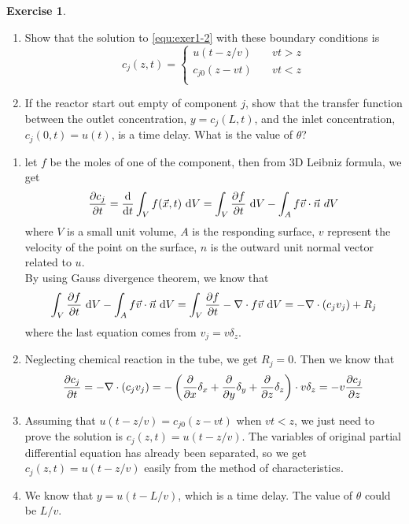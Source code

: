 \documentclass[11pt,a4paper]{report}
\theoremstyle{definition}\newtheorem{exercise}{Exercise}[chapter]
\begin{document}
\begin{exercise}
\begin{enumerate}[label=(\alph*)]
    \item Show that the solution to \eqref{equ:exer1-2} with these boundary conditions is 
    \begin{equation}
        c_j(z,t) = 
        \begin{cases}
            u(t-z/v) & \quad vt>z\\
            c_{j0}(z-vt) & \quad vt<z\\ 
        \end{cases}
    \end{equation}
    \item If the reactor start out empty of component $j$, show that the transfer function between the outlet concentration, $y=c_j(L,t)$, and the inlet concentration, $c_j(0,t)=u(t)$, is a time delay. What is the value of $\theta$?
\end{enumerate}
\end{exercise}

\begin{answer}
\begin{enumerate}[label=(\alph*)]
    \item let $f$ be the moles of one of the component, then from 3D Leibniz formula, we get 
    \begin{equation}
        \pdv{c_j}{t}=\dv{}{t}\int_{V}f(\vec x,t)~\mathrm{d}V = 
        \int_V \pdv{f}{t}~\mathrm{d}V - 
        \int_A f\vec v\cdot \vec n\mathrm~{d}V
    \end{equation}
    where $V$ is a small unit volume, $A$ is the responding surface, $v$ represent the velocity of the point on the surface, $n$ is the outward unit normal vector related to $u$.\\
    By using Gauss divergence theorem, we know that
    \begin{equation}
        \int_V \pdv{f}{t}~\mathrm{d}V -
        \int_A f\vec v\cdot \vec n~\mathrm{d}V =
        \int_V \pdv{f}{t} - \nabla \cdot f\vec v~\mathrm{d}V = 
        -\nabla\cdot(c_j v_j)+R_j
    \end{equation} 
    where the last equation comes from $v_j=v\delta_z$.

    \item Neglecting chemical reaction in the tube, we get $R_j=0$. Then we know that
    \begin{equation}
        \pdv{c_j}{t}=-\nabla\cdot(c_j v_j)=
        -\left(\pdv{}{x}\delta_x+\pdv{}{y}\delta_y+\pdv{}{z}\delta_z\right)\cdot v\delta_z=-v\pdv{c_j}{z}
    \end{equation}

    \item Assuming that $u(t-z/v)=c_{j0}(z-vt)$ when $vt<z$, we just need to prove the solution is $c_j(z,t)=u(t-z/v)$. The variables of original partial differential equation has already been separated, so we get $c_j(z,t)=u(t-z/v)$ easily from the method of characteristics.

    \item We know that $y=u(t-L/v)$, which is a time delay. The value of $\theta$ could be $L/v$.
\end{enumerate}
\end{answer}
\end{document}
